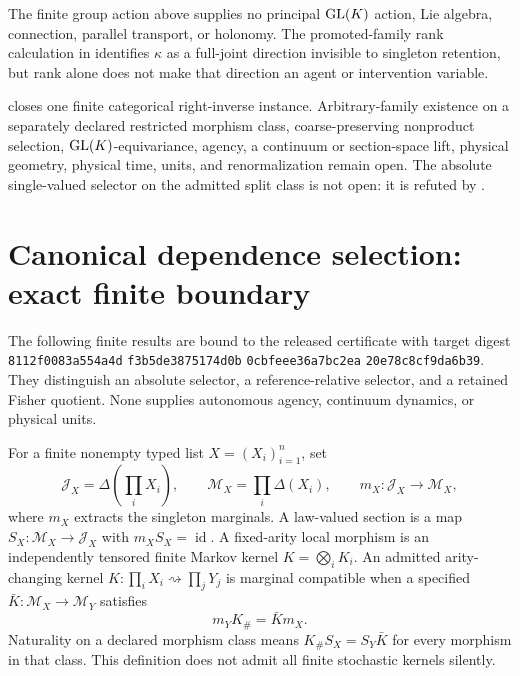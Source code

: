 The finite group action above supplies no principal \(\mathrm{GL}(K)\) action, Lie
algebra, connection, parallel transport, or holonomy.  The promoted-family
rank calculation in  identifies \(\kappa\)
as a full-joint direction invisible to singleton retention, but rank alone
does not make that direction an agent or intervention variable.

 closes one finite categorical
right-inverse instance.  Arbitrary-family existence on a separately declared
restricted morphism class, coarse-preserving nonproduct selection,
\(\mathrm{GL}(K)\)-equivariance, agency, a continuum or section-space lift, physical
geometry, physical time, units, and renormalization remain open.  The absolute
single-valued selector on the admitted split class is not open: it is refuted
by .  

\section{Canonical dependence selection: exact finite boundary}
\label{sec:hist-canonical-dependence-selection}

The following finite results are bound to the released certificate with
target digest
\texttt{8112f0083a554a4d}\allowbreak%
\texttt{f3b5de3875174d0b}\allowbreak%
\texttt{0cbfeee36a7bc2ea}\allowbreak%
\texttt{20e78c8cf9da6b39}.
They distinguish an absolute selector, a reference-relative selector, and a
retained Fisher quotient.  None supplies autonomous agency, continuum
dynamics, or physical units.

For a finite nonempty typed list \(X=(X_i)_{i=1}^n\), set
\begin{equation}
\mathcal J_X=\Delta\!\left(\prod_iX_i\right),
\qquad
\mathcal M_X=\prod_i\Delta(X_i),
\qquad
m_X:\mathcal J_X\longrightarrow\mathcal M_X,
\label{eq:hist-cds-marginalization}
\end{equation}
where \(m_X\) extracts the singleton marginals.  A law-valued section is a
map \(S_X:\mathcal M_X\to\mathcal J_X\) with \(m_XS_X=\operatorname{id}\).  A fixed-arity
local morphism is an independently tensored finite Markov kernel
\(K=\bigotimes_iK_i\).  An admitted arity-changing kernel
\(K:\prod_iX_i\rightsquigarrow\prod_jY_j\) is marginal compatible when a
specified \(\bar K:\mathcal M_X\to\mathcal M_Y\) satisfies
\begin{equation}
m_YK_\#=\bar K m_X.
\label{eq:hist-cds-marginal-compatibility}
\end{equation}
Naturality on a declared morphism class means
\(K_\#S_X=S_Y\bar K\) for every morphism in that class.  This definition does
not admit all finite stochastic kernels silently.  

